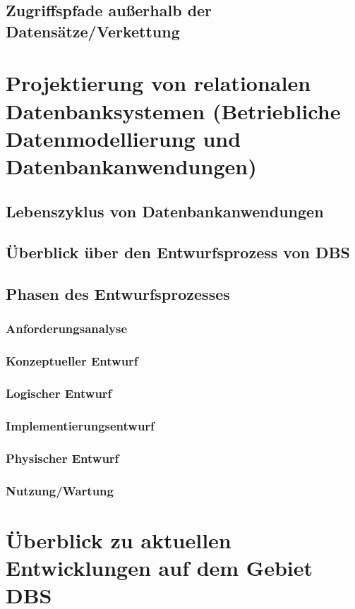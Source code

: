 \section{Zugriffspfade außerhalb der Datensätze/Verkettung}

\chapter{Projektierung von relationalen Datenbanksystemen (Betriebliche Datenmodellierung und Datenbankanwendungen)}
\section{Lebenszyklus von Datenbankanwendungen}
\section{Überblick über den Entwurfsprozess von DBS}
\section{Phasen des Entwurfsprozesses}
\subsection{Anforderungsanalyse}
\subsection{Konzeptueller Entwurf}
\subsection{Logischer Entwurf}
\subsection{Implementierungsentwurf}
\subsection{Physischer Entwurf}
\subsection{Nutzung/Wartung}

\chapter{Überblick zu aktuellen Entwicklungen auf dem Gebiet DBS}


